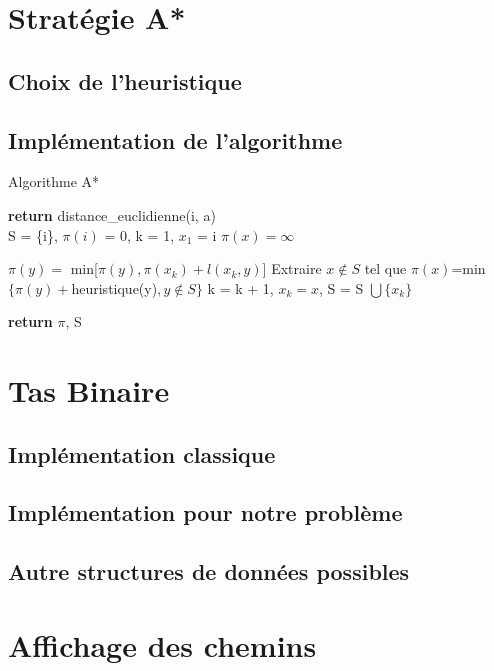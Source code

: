 \documentclass{article}
\begin{document}
\pagebreak
\section{Stratégie A*}

\subsection{Choix de l'heuristique}

\subsection{Implémentation de l'algorithme}

\begin{algorithm}
\caption{Algorithme A*}\label{astar}
\begin{algorithmic}[1]
 
	\State \textbf{return} distance\_euclidienne(i, a)
\EndProcedure
\\
	\State S = \{i\}, $\pi(i)$ = 0, k = 1, $x_1$ = i
		\State $\pi(x) = \infty$
	\EndFor
	
			\State $\pi(y) = $ min[$\pi(y), \pi(x_k) + l(x_k, y)$]
		\EndFor
		\State Extraire $x \not\in S$ tel que $\pi(x)$=min$\{\pi(y)+$heuristique(y)$, y \not\in S\}$
		\State k = k + 1, $x_k = x$, S = S $\bigcup \{x_k\}$
	\EndWhile
	
	\State \textbf{return} $\pi$, S
\EndProcedure
\end{algorithmic}
\end{algorithm}

\pagebreak
\section{Tas Binaire}

\subsection{Implémentation classique}

\subsection{Implémentation pour notre problème}

\subsection{Autre structures de données possibles}

\pagebreak
\section{Affichage des chemins}
\end{document}
